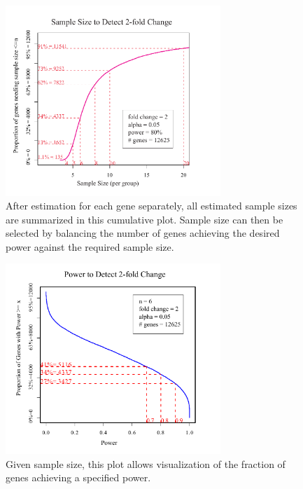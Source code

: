 \documentclass{bioinfo}
\begin{document}
\begin{figure}[h]
  \centerline{\includegraphics*[width=3.2in]{CumPlotP.pdf}}
  \caption[Effect of Sample Size on Power]{
    After estimation for each gene separately, all estimated sample
    sizes are summarized in this cumulative plot. Sample size can then
    be selected by balancing the number of genes achieving the desired
    power against the required sample size.}
  \label{fig:CumNPlot}
\end{figure}

\begin{figure}[h]
  \centerline{\includegraphics*[width=3.2in]{CumPowerPlotP.pdf}}
  \caption[Given Sample Size, Fraction of Genes Achieving a Specified Power]{
    Given sample size, this plot allows visualization of the fraction
    of genes achieving a specified power.}
  \label{fig:CumPowerPlot}
\end{figure}
\end{document}
